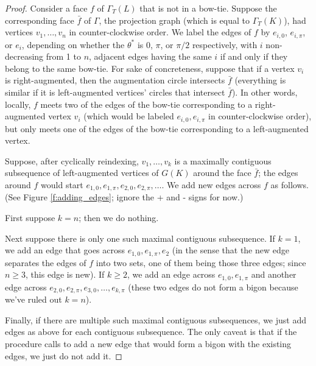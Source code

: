 \documentclass[11pt]{amsart}
\theoremstyle{plain}
\theoremstyle{definition}
\begin{document}
\begin{proof}
Consider a face $f$ of $\Gamma_T(L)$ that is not in a bow-tie.
Suppose the corresponding face $\bar{f}$ of $\Gamma$,
the projection graph (which is equal to $\Gamma_T(K)$),
had vertices $v_1,\ldots,v_n$ in counter-clockwise order.
We label the edges of $f$ by $e_{i,0}$, $e_{i,\pi}$, or $e_i$,
depending on whether the $\theta^*$ is $0$, $\pi$, or $\pi/2$ respectively,
with $i$ non-decreasing from 1 to $n$,
adjacent edges having the same $i$ if and only if they
belong to the same bow-tie.
For sake of concreteness,
suppose that if a vertex $v_i$ is right-augmented,
then the augmentation circle intersects $\bar{f}$
(everything is similar if it is left-augmented vertices' circles
that intersect $\bar{f}$).
In other words, locally, $f$ meets two of the edges of the bow-tie
corresponding to a right-augmented vertex $v_i$
(which would be labeled $e_{i,0}, e_{i,\pi}$ in counter-clockwise order),
but only meets one of the edges of the bow-tie corresponding to
a left-augmented vertex.


Suppose, after cyclically reindexing, $v_1,\ldots,v_k$
is a maximally contiguous subsequence of left-augmented vertices
of $G(K)$ around the face $\bar{f}$;
the edges around $f$ would start
$e_{1,0}, e_{1,\pi}, e_{2,0}, e_{2,\pi}, \ldots$.
We add new edges across $f$ as follows.
(See Figure \ref{f:adding_edges};
ignore the + and - signs for now.)


First suppose $k=n$; then we do nothing.

Next suppose there is only one such maximal contiguous subsequence.
If $k = 1$, we add an edge that goes across
$e_{1,0},e_{1,\pi},e_2$
(in the sense that the new edge separates the edges of $f$ into two sets,
one of them being those three edges;
since $n\geq 3$, this edge is new).
If $k \geq 2$,
we add an edge across $e_{1,0},e_{1,\pi}$
and another edge across $e_{2,0},e_{2,\pi},e_{3,0},\ldots,e_{k,\pi}$
(these two edges do not form a bigon because we've ruled out $k=n$).

Finally, if there are multiple such maximal contiguous subsequences,
we just add edges as above for each contiguous subsequence.
The only caveat is that if the procedure calls to add a new edge
that would form a bigon with the existing edges,
we just do not add it.



\end{proof}
\end{document}

